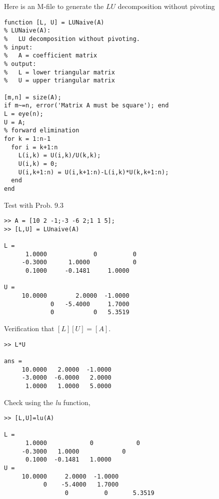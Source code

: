 \documentclass[../main.tex]{subfiles}
\begin{document}
\section{}
Here is an M-file to generate the $L U$ decomposition without pivoting
\bigbreak
\begin{lstlisting}[numbers=none]
function [L, U] = LUNaive(A)
% LUNaive(A):
%   LU decomposition without pivoting.
% input:
%   A = coefficient matrix
% output:
%   L = lower triangular matrix
%   U = upper triangular matrix

[m,n] = size(A);
if m~=n, error('Matrix A must be square'); end
L = eye(n);
U = A;
% forward elimination
for k = 1:n-1
  for i = k+1:n
    L(i,k) = U(i,k)/U(k,k);
    U(i,k) = 0;
    U(i,k+1:n) = U(i,k+1:n)-L(i,k)*U(k,k+1:n);
  end
end
\end{lstlisting}
\bigbreak
Test with Prob. 9.3
\bigbreak
\begin{lstlisting}[numbers=none]
>> A = [10 2 -1;-3 -6 2;1 1 5];
>> [L,U] = LUnaive(A)

L =
 	  1.0000 		     0 		    0
 	 -0.3000 	  1.0000 		    0
 	  0.1000 	 -0.1481 	 1.0000
 	
U =
 	 10.0000 		2.0000 	-1.0000
 	   		 0	 -5.4000 	 1.7000
 	  		 0 		     0 	 5.3519 
\end{lstlisting}
\bigbreak
Verification that $[L][U]=[A]$.
\bigbreak
\begin{lstlisting}[numbers=none]
>> L*U

ans =
 	 10.0000   2.0000  -1.0000
 	 -3.0000  -6.0000   2.0000
 	  1.0000   1.0000   5.0000 
\end{lstlisting}
\bigbreak
Check using the \textit{ lu} function,
\bigbreak
\begin{lstlisting}[numbers=none]
>> [L,U]=lu(A)

L =
 	  1.0000 		    0 			 0
 	 -0.3000   1.0000 			 0
 	  0.1000  -0.1481 	1.0000
U =
 	 10.0000	 2.0000	 -1.0000
 	       0	-5.4000   1.7000
 		 		 0		    0		5.3519
\end{lstlisting}
\bigbreak
\end{document}
